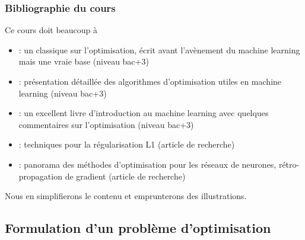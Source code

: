 \documentclass[12pt]{beamer}
\begin{document}
\begin{frame}
\frametitle{Bibliographie du cours}
{\small
Ce cours doit beaucoup à
\begin{itemize}
\item \cite{minoux2008programmation} : un classique sur l'optimisation, écrit avant l'avènement du machine learning mais une vraie base (niveau bac+3)
\item \cite{ravikumar17} : présentation détaillée des algorithmes d'optimisation utiles en machine learning (niveau bac+3)
\item \cite{bishop2006pattern} : un excellent livre d'introduction au machine learning avec quelques commentaires sur l'optimisation (niveau bac+3)
\item \cite{schmidt2007fast} : techniques pour la régularisation L1 (article de recherche)
\item \cite{sun2019optimization} : panorama des méthodes d'optimisation pour les réseaux de neurones, rétro-propagation de gradient (article de recherche)
\end{itemize}
Nous en simplifierons le contenu et emprunterons des illustrations.
} %
\end{frame}

\subsection{Formulation d'un problème d'optimisation}
\end{document}
